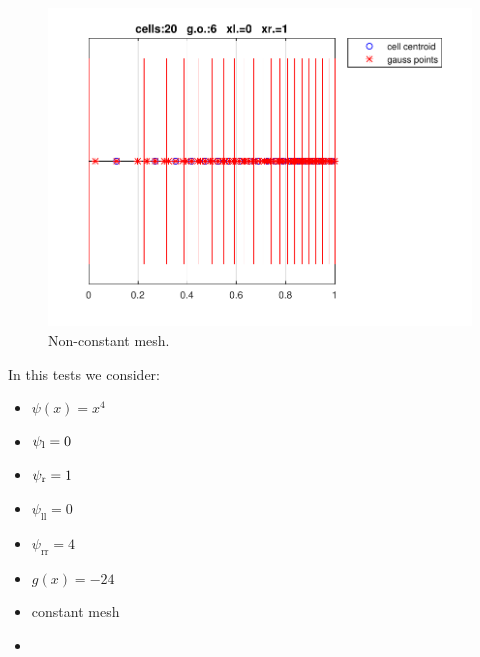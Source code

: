\documentclass[11pt,a4paper]{article}
\theoremstyle{plain}
\theoremstyle{definition}
\begin{document}
\begin{figure}[H]
\centering
\includegraphics[width=.8\textwidth]{../../tests_01_01/test_01_01_test48_pro1_cons/output/plots/mesh.pdf}
\caption{Non-constant mesh.}
\end{figure}
\pagebreak

\pagebreak
In this tests we consider:
\begin{itemize}
\item $\psi(x)=x^4$
\item $\psi_\text l=0$
\item $\psi_\text r=1$
\item $\psi_\text{ll}=0$
\item $\psi_\text{rr}=4$
\item $g(x)=-24$
\item constant mesh
\item 
\end{itemize}


\end{document}
